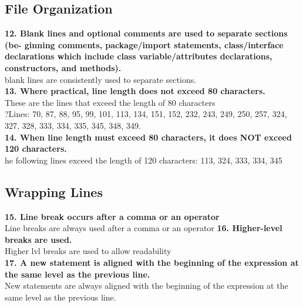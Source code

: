 \documentclass{article}
\begin{document}
\begin{flushleft}
\subsection{ File Organization}
\textbf{12. Blank lines and optional comments are used to separate sections (be- ginning comments, package/import statements, class/interface declarations which include class variable/attributes declarations, constructors, and methods).}\\
\vspace{0.5cm}
blank lines are consistently used to separate sections. \\
\vspace{0.5cm}
\textbf{13. Where practical, line length does not exceed 80 characters.}\\
\vspace{0.5cm}
These are the lines that exceed the length of 80 characters\\
\vspace{0.5cm}?Lines: 70, 87, 88, 95, 99, 101, 113, 134, 151, 152, 232, 243, 249, 250, 257, 324, 327, 328, 333, 334, 335, 345, 348, 349. \\
\vspace{0.5cm}
\textbf{14. When line length must exceed 80 characters, it does NOT exceed 120 characters.}\\
\vspace{0.5cm}
he following lines exceed the length of 120 characters: 113, 324, 333, 334, 345 \\
\vspace{0.5cm}


\subsection{Wrapping Lines}
\textbf{15. Line break occurs after a comma or an operator}\\
\vspace{0.5cm}
Line breaks are always used after a comma or an operator
\vspace{0.5cm}
\textbf{16. Higher-level breaks are used.}\\
\vspace{0.5cm}
Higher lvl breaks are used to allow readability\\
\vspace{0.5cm}
\textbf{17. A new statement is aligned with the beginning of the expression at the same level as the previous line.}\\
\vspace{0.5cm}
New statements are always aligned with the beginning of the expression at the same level as the previous line.\\
\vspace{0.5cm}



\end{flushleft}
\end{document}

